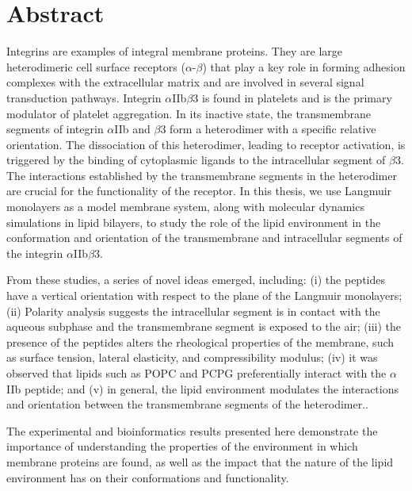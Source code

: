 \newpage
\thispagestyle{empty}
\section*{Abstract}

Integrins are examples of integral membrane proteins. They are large heterodimeric cell surface receptors ($\alpha$-$\beta$) that play a key role in forming adhesion complexes with the extracellular matrix and are involved in several signal transduction pathways. Integrin $\alpha$IIb$\beta$3 is found in platelets and is the primary modulator of platelet aggregation. In its inactive state, the transmembrane segments of integrin $\alpha$IIb and $\beta$3 form a heterodimer with a specific relative orientation. The dissociation of this heterodimer, leading to receptor activation, is triggered by the binding of cytoplasmic ligands to the intracellular segment of $\beta$3. The interactions established by the transmembrane segments in the heterodimer are crucial for the functionality of the receptor. In this thesis, we use Langmuir monolayers as a model membrane system, along with molecular dynamics simulations in lipid bilayers, to study the role of the lipid environment in the conformation and orientation of the transmembrane and intracellular segments of the integrin $\alpha$IIb$\beta$3.

From these studies, a series of novel ideas emerged, including: (i) the peptides have a vertical orientation with respect to the plane of the Langmuir monolayers; (ii) Polarity analysis suggests the intracellular segment is in contact with the aqueous subphase and the transmembrane segment is exposed to the air; (iii) the presence of the peptides alters the rheological properties of the membrane, such as surface tension, lateral elasticity, and compressibility modulus; (iv) it was observed that lipids such as POPC and PCPG preferentially interact with the $\alpha$IIb peptide; and (v) in general, the lipid environment modulates the interactions and orientation between the transmembrane segments of the heterodimer..

The experimental and bioinformatics results presented here demonstrate the importance of understanding the properties of the environment in which membrane proteins are found, as well as the impact that the nature of the lipid environment has on their conformations and functionality.
